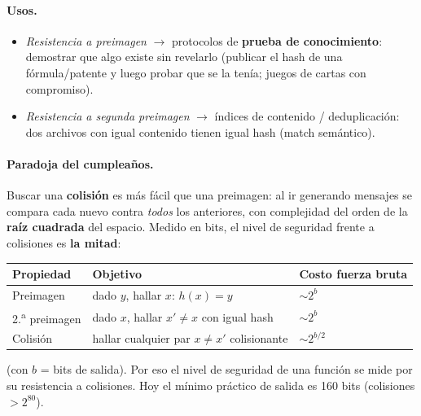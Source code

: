 \documentclass[../main.tex]{subfiles}
\begin{document}
\paragraph{Usos.}
\begin{itemize}[leftmargin=1.4em,nosep]
  \item \emph{Resistencia a preimagen} $\to$ protocolos de \textbf{prueba de
  conocimiento}: demostrar que algo existe sin revelarlo (publicar el hash de una
  fórmula/patente y luego probar que se la tenía; juegos de cartas con compromiso).
  \item \emph{Resistencia a segunda preimagen} $\to$ índices de contenido /
  deduplicación: dos archivos con igual contenido tienen igual hash (match semántico).
\end{itemize}

\paragraph{Paradoja del cumpleaños.} Buscar una \textbf{colisión} es más fácil que una
preimagen: al ir generando mensajes se compara cada nuevo contra \emph{todos} los
anteriores, con complejidad del orden de la \textbf{raíz cuadrada} del espacio.
Medido en bits, el nivel de seguridad frente a colisiones es \textbf{la mitad}:
\begin{center}
\begin{tabular}{lll}
\toprule
Propiedad & Objetivo & Costo fuerza bruta \\
\midrule
Preimagen & dado $y$, hallar $x$: $h(x)=y$ & $\sim 2^{b}$ \\
2.\textsuperscript{a} preimagen & dado $x$, hallar $x' \neq x$ con igual hash & $\sim 2^{b}$ \\
Colisión & hallar cualquier par $x \neq x'$ colisionante & $\sim 2^{b/2}$ \\
\bottomrule
\end{tabular}
\end{center}
\noindent (con $b$ = bits de salida). Por eso el nivel de seguridad de una función se
mide por su resistencia a colisiones. Hoy el mínimo práctico de salida es 160 bits
(colisiones $> 2^{80}$).
\end{document}
